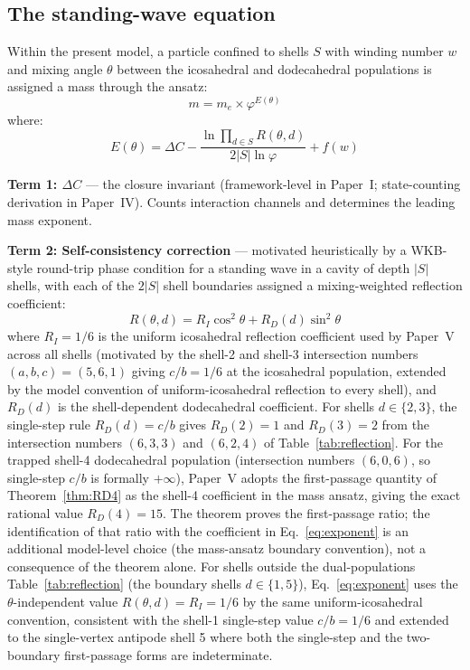 \documentclass[12pt]{article}
\newcommand{\phig}{\varphi}
\begin{document}
\subsection{The standing-wave equation}

Within the present model, a particle confined to shells $S$ with winding number $w$ and mixing angle $\theta$ between the icosahedral and dodecahedral populations is assigned a mass through the ansatz:
\begin{equation}\label{eq:mass}
    m = m_e \times \phig^{E(\theta)}
\end{equation}
where:
\begin{equation}\label{eq:exponent}
    E(\theta) = \Delta C - \frac{\ln \prod_{d \in S} R(\theta, d)}{2|S| \ln \phig} + f(w)
\end{equation}

\textbf{Term 1: $\Delta C$} --- the closure invariant (framework-level in Paper~I; state-counting derivation in Paper~IV). Counts interaction channels and determines the leading mass exponent.

\textbf{Term 2: Self-consistency correction} --- motivated heuristically by a WKB-style round-trip phase condition for a standing wave in a cavity of depth $|S|$ shells, with each of the $2|S|$ shell boundaries assigned a mixing-weighted reflection coefficient:
\begin{equation}
    R(\theta, d) = R_I \cos^2\theta + R_D(d) \sin^2\theta
\end{equation}
where $R_I = 1/6$ is the uniform icosahedral reflection coefficient used by Paper~V across all shells (motivated by the shell-2 and shell-3 intersection numbers $(a, b, c) = (5, 6, 1)$ giving $c/b = 1/6$ at the icosahedral population, extended by the model convention of uniform-icosahedral reflection to every shell), and $R_D(d)$ is the shell-dependent dodecahedral coefficient. For shells $d \in \{2, 3\}$, the single-step rule $R_D(d) = c/b$ gives $R_D(2) = 1$ and $R_D(3) = 2$ from the intersection numbers $(6, 3, 3)$ and $(6, 2, 4)$ of Table~\ref{tab:reflection}. For the trapped shell-4 dodecahedral population (intersection numbers $(6, 0, 6)$, so single-step $c/b$ is formally $+\infty$), Paper~V adopts the first-passage quantity of Theorem~\ref{thm:RD4} as the shell-4 coefficient in the mass ansatz, giving the exact rational value $R_D(4) = 15$. The theorem proves the first-passage ratio; the identification of that ratio with the coefficient in Eq.~\eqref{eq:exponent} is an additional model-level choice (the mass-ansatz boundary convention), not a consequence of the theorem alone. For shells outside the dual-populations Table~\ref{tab:reflection} (the boundary shells $d \in \{1, 5\}$), Eq.~\eqref{eq:exponent} uses the $\theta$-independent value $R(\theta, d) = R_I = 1/6$ by the same uniform-icosahedral convention, consistent with the shell-1 single-step value $c/b = 1/6$ and extended to the single-vertex antipode shell 5 where both the single-step and the two-boundary first-passage forms are indeterminate.
\end{document}
